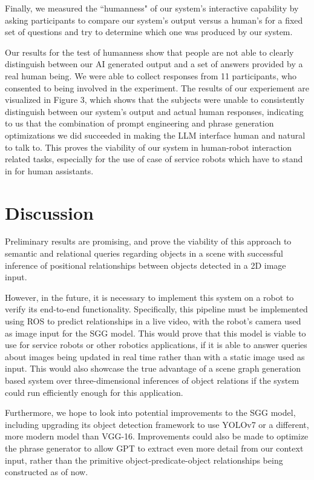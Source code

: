 \documentclass[letterpaper, 10 pt, conference]{ieeeconf}  %
\begin{document}
    Finally, we measured the ``humanness" of our system's interactive capability by asking participants to compare our system's output versus a human's for a fixed set of questions and try to determine which one was produced by our system. 
    
    Our results for the test of humanness show that people are not able to clearly distinguish between our AI generated output and a set of answers provided by a real human being. We were able to collect responses from 11 participants, who consented to being involved in the experiment. The results of our experiement are visualized in Figure 3, which shows that the subjects were unable to consistently distinguish between our system's output and actual human responses, indicating to us that the combination of prompt engineering and phrase generation optimizations we did succeeded in making the LLM interface human and natural to talk to. This proves the viability of our system in human-robot interaction related tasks, especially for the use of case of service robots which have to stand in for human assistants.

\section{Discussion}
    Preliminary results are promising, and prove the viability of this approach to semantic and relational queries regarding objects in a scene with successful inference of positional relationships between objects detected in a 2D image input. 
    
    However, in the future, it is necessary to implement this system on a robot to verify its end-to-end functionality. Specifically, this pipeline must be implemented using ROS to predict relationships in a live video, with the robot's camera used as image input for the SGG model. This would prove that this model is viable to use for service robots or other robotics applications, if it is able to answer queries about images being updated in real time rather than with a static image used as input. This would also showcase the true advantage of a scene graph generation based system over three-dimensional inferences of object relations if the system could run efficiently enough for this application.

    Furthermore, we hope to look into potential improvements to the SGG model, including upgrading its object detection framework to use YOLOv7 or a different, more modern model than VGG-16. Improvements could also be made to optimize the phrase generator to allow GPT to extract even more detail from our context input, rather than the primitive object-predicate-object relationships being constructed as of now. 
    
\end{document}
